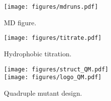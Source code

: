 \documentclass[12pt]{article}
\begin{document}
\begin{figure}[!h]
\begin{center}
\vspace*{-1cm}
\texttt{[image: figures/mdruns.pdf]} 
\end{center}
\caption[width=1cm]{MD figure.}
\label{fig:mdruns} 
\end{figure}

\begin{figure}[!h]
\begin{center}
\vspace*{-1.5cm}
\texttt{[image: figures/titrate.pdf]}
\end{center}
\caption[width=1cm]{Hydrophobic titration.}
\label{fig:titrate} 
\end{figure}

\begin{figure}[!h]
\begin{center}
\vspace*{-1.5cm}
\texttt{[image: figures/struct\_QM.pdf]} \\
\texttt{[image: figures/logo\_QM.pdf]} \\
\end{center}
\caption[width=1cm]{Quadruple mutant design.}
\label{fig:tiamQM} 
\end{figure}
\end{document}
